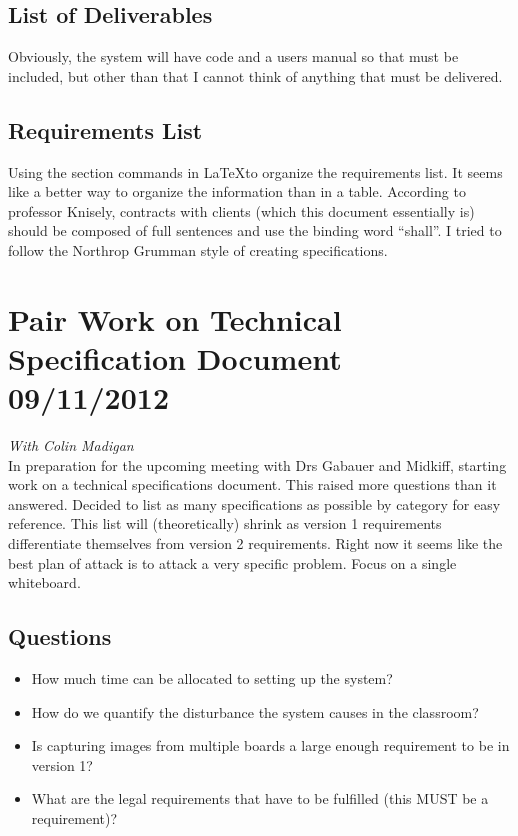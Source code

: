 \documentclass[]{article}
\begin{document}
		\subsection{List of Deliverables}
			Obviously, the system will have code and a users manual so that must be included, but other than that I cannot think of anything that must be delivered.
			
		\subsection{Requirements List}
			Using the section commands in \LaTeX to organize the requirements list. It seems like a better way to organize the information than in a table. According to professor Knisely, contracts with clients (which this document essentially is) should be composed of full sentences and use the binding word ``shall''. I tried to follow the Northrop Grumman style of creating specifications. 
				
	\section{Pair Work on Technical Specification Document 09/11/2012}
		\emph{With Colin Madigan}\\
		In preparation for the upcoming meeting with Drs Gabauer and Midkiff, starting work on a technical specifications document. This raised more questions than it answered. Decided to list as many specifications as possible by category for easy reference. This list will (theoretically) shrink as version 1 requirements differentiate themselves from version 2 requirements. Right now it seems like the best plan of attack is to attack a very specific problem. Focus on a single whiteboard.\\
		
		\subsection{Questions}
			\begin{itemize}
				\item How much time can be allocated to setting up the system?
				\item How do we quantify the disturbance the system causes in the classroom?
				\item Is capturing images from multiple boards a large enough requirement to be in version 1?
				\item What are the legal requirements that have to be fulfilled (this MUST be a requirement)?
			\end{itemize}
			
\end{document}
